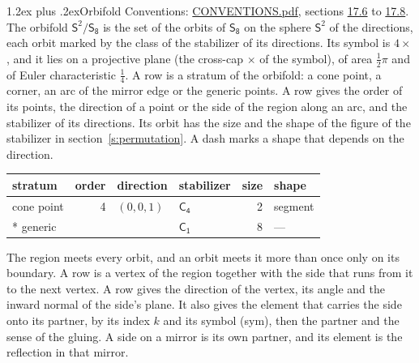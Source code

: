 \documentclass[10pt,a4paper]{article}
\makeatletter
\renewcommand\section{\@startsection{section}{1}{\z@}{-3ex plus -1ex minus -.2ex}%
  {1.2ex plus .2ex}{\normalfont\large\sffamily\bfseries\color{parttitle}}}
\numberwithin{equation}{section}
\newcommand{\grp}[1]{\mathsf{#1}}
\newcommand{\orbname}[1]{#1}
\newcommand{\dirvec}[3]{(#1, #2, #3)}
\newcommand{\twosphere}{\mathsf{S}^{2}}
\makeatother
\begin{document}
\section{Orbifold}\label{s:orbifold}
Conventions: \href{../../CONVENTIONS.pdf}{CONVENTIONS.pdf}, sections \href{../../CONVENTIONS.pdf\#conv.17.6}{17.6} to \href{../../CONVENTIONS.pdf\#conv.17.8}{17.8}.
The orbifold $\twosphere/\grp{S_{8}}$ is the set of the orbits of $\grp{S_{8}}$ on the sphere $\twosphere$ of the directions, each orbit marked by the class of the stabilizer of its directions. Its symbol is $\orbname{4{\times}}$, and it lies on a projective plane (the cross-cap ${\times}$ of the symbol), of area $\tfrac{1}{2}\pi$ and of Euler characteristic $\tfrac{1}{4}$.
\leavevmode\label{n:head.stratum}\label{n:head.order.point}\label{n:head.direction}\label{n:head.stabilizer}\label{n:head.size.orbit}\label{n:head.shape}A row is a stratum of the orbifold: a cone point, a corner, an arc of the mirror edge or the generic points. A row gives the order of its points, the direction of a point or the side of the region along an arc, and the stabilizer of its directions. Its orbit has the size and the shape of the figure of the stabilizer in section~\ref{s:permutation}. A dash marks a shape that depends on the direction.
{\small\setlength{\tabcolsep}{4pt}\begin{longtable}{@{}lrllrl@{}}\toprule
stratum & order & direction & stabilizer & size & shape\\\midrule\endhead
\bottomrule\endfoot\endlastfoot
cone point & 4 & $\dirvec{0}{0}{1}$ & \href{C4.pdf}{$\grp{C_{4}}$} & 2 & segment\\*
generic &  &  & \href{C1.pdf}{$\grp{C_{1}}$} & 8 & ---\\
\bottomrule\end{longtable}}
\leavevmode\label{n:head.vertex.region}\label{n:head.angle}\label{n:head.normal.side}\label{n:head.partner}\label{n:head.sense}The region meets every orbit, and an orbit meets it more than once only on its boundary. A row is a vertex of the region together with the side that runs from it to the next vertex. A row gives the direction of the vertex, its angle and the inward normal of the side's plane. It also gives the element that carries the side onto its partner, by its index $k$ and its symbol (sym), then the partner and the sense of the gluing. A side on a mirror is its own partner, and its element is the reflection in that mirror.
\end{document}
